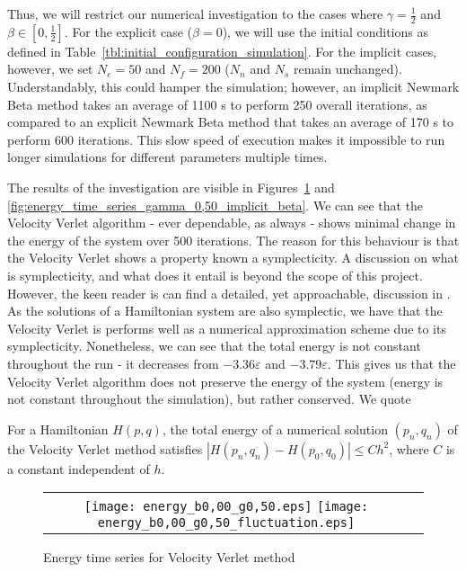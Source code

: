 \documentclass[../Main.tex]{subfiles}
\begin{document}
Thus, we will restrict our numerical investigation to the cases where $\gamma = \frac{1}{2}$ and $\beta \in \left[0, \frac{1}{2}\right]$.
For the explicit case ($\beta = 0$), we will use the initial conditions as defined in Table~\ref{tbl:initial_configuration_simulation}. For the implicit cases, however, we set $N_{e} = 50$ and $N_{f} = 200$ ($N_{n}$ and $N_{s}$ remain unchanged). Understandably, this could hamper the simulation; however, an implicit Newmark Beta method takes an average of 1100 s to perform 250 overall iterations, as compared to an explicit Newmark Beta method that takes an average of 170 s to perform 600 iterations. This slow speed of execution makes it impossible to run longer simulations for different parameters multiple times.

The results of the investigation are visible in Figures~\ref{fig:energy_time_series_velocity_verlet} and \ref{fig:energy_time_series_gamma_0,50_implicit_beta}. We can see that the Velocity Verlet algorithm - ever dependable, as always - shows minimal change in the energy of the system over 500 iterations. The reason for this behaviour is that the Velocity Verlet shows a property known a symplecticity. A discussion on what is symplecticity, and what does it entail is beyond the scope of this project. However, the keen reader is can find a detailed, yet approachable, discussion in \cite{Sanz-serna1992}. As the solutions of a Hamiltonian system are also symplectic, we have that the Velocity Verlet is performs well as a numerical approximation scheme due to its symplecticity. Nonetheless, we can see that the total energy is not constant throughout the run - it decreases from $-3.36\varepsilon$ and $-3.79\varepsilon$. This gives us that the Velocity Verlet algorithm does not preserve the energy of the system (energy is not constant throughout the simulation), but rather conserved. We quote \cite{Harier2006}
\begin{theorem}
For a Hamiltonian $H(p, q)$, the total energy of a numerical solution $\left(p_{n}, q_{n}\right)$ of the Velocity Verlet method satisfies 
$\left|H\left(p_{n}, q_{n}\right) - H\left(p_{0}, q_{0}\right) \right| \leq Ch^{2}$, where $C$ is a constant independent of $h$.
\end{theorem}

\begin{figure}[H]
\centering
 	\begin{tabular}{@{}cc@{}}
		\texttt{[image: energy\_b0,00\_g0,50.eps]}
		\texttt{[image: energy\_b0,00\_g0,50\_fluctuation.eps]}
	\end{tabular}
	\caption{Energy time series for Velocity Verlet method}
	\label{fig:energy_time_series_velocity_verlet}
\end{figure}
\end{document}
